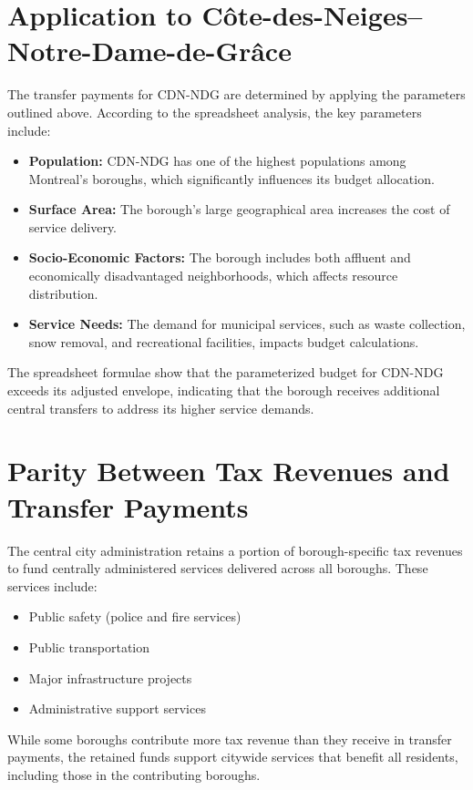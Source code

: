 \documentclass{article}
\begin{document}
\section{Application to Côte-des-Neiges–Notre-Dame-de-Grâce}
The transfer payments for CDN-NDG are determined by applying the parameters outlined above. According to the spreadsheet analysis, the key parameters include:

\begin{itemize}
    \item \textbf{Population:} CDN-NDG has one of the highest populations among Montreal's boroughs, which significantly influences its budget allocation.
    \item \textbf{Surface Area:} The borough's large geographical area increases the cost of service delivery.
    \item \textbf{Socio-Economic Factors:} The borough includes both affluent and economically disadvantaged neighborhoods, which affects resource distribution.
    \item \textbf{Service Needs:} The demand for municipal services, such as waste collection, snow removal, and recreational facilities, impacts budget calculations.
\end{itemize}

The spreadsheet formulae show that the parameterized budget for CDN-NDG exceeds its adjusted envelope, indicating that the borough receives additional central transfers to address its higher service demands.

\section{Parity Between Tax Revenues and Transfer Payments}
The central city administration retains a portion of borough-specific tax revenues to fund centrally administered services delivered across all boroughs. These services include:

\begin{itemize}
    \item Public safety (police and fire services)
    \item Public transportation
    \item Major infrastructure projects
    \item Administrative support services
\end{itemize}

While some boroughs contribute more tax revenue than they receive in transfer payments, the retained funds support citywide services that benefit all residents, including those in the contributing boroughs.
\end{document}
